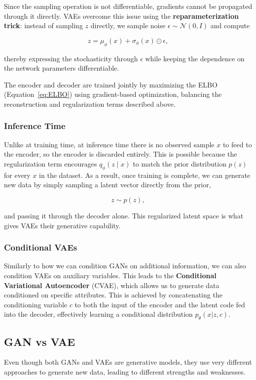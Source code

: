 Since the sampling operation is not differentiable, gradients cannot be propagated through it directly. VAEs overcome this issue using the \textbf{reparameterization trick}: instead of sampling $z$ directly, we sample noise $\epsilon \sim \mathcal{N}(0, I)$ and compute

\[
z = \mu_\phi(x) + \sigma_\phi(x) \odot \epsilon,
\]

thereby expressing the stochasticity through $\epsilon$ while keeping the dependence on the network parameters differentiable.

The encoder and decoder are trained jointly by maximizing the ELBO (Equation~\ref{eq:ELBO}) using gradient-based optimization, balancing the reconstruction and regularization terms described above.

\subsubsection{Inference Time}

Unlike at training time, at inference time there is no observed sample $x$ to feed to the encoder, so the encoder is discarded entirely. 
This is possible because the regularization term encourages $q_\phi(z \mid x)$ to match the prior distribution $p(z)$ for every $x$ in the dataset. 
As a result, once training is complete, we can generate new data by simply sampling a latent vector directly from the prior,

\[
z \sim p(z),
\]

and passing it through the decoder alone. This regularized latent space is what gives VAEs their generative capability.


\subsubsection{Conditional VAEs}
Similarly to how we can condition GANs on additional information, we can also condition VAEs on auxiliary variables. 
This leads to the \textbf{Conditional Variational Autoencoder} (CVAE), which allows us to generate data conditioned on specific attributes.
This is achieved by concatenating the conditioning variable $c$ to both the input of the encoder and the latent code fed into the decoder, effectively learning a conditional distribution $p_\theta(x|z,c)$.

\subsection{GAN vs VAE}
Even though both GANs and VAEs are generative models, they use very different approaches to generate new data, leading to different strengths and weaknesses.

